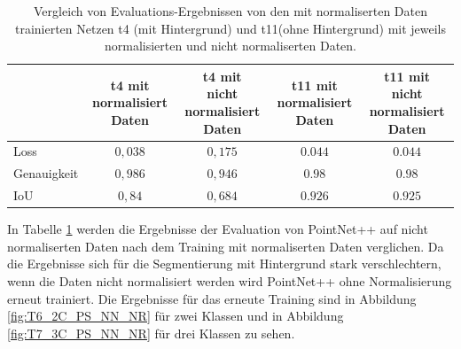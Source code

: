 \documentclass[12pt,titlepage, twoside]{article}
\begin{document}
\begin{table}
    \begin{center}
    \begin{tabular}{|l || c | c || c | c | } 
        \hline
         & \thead{t4 mit \\ normalisiert Daten}  & \thead{t4 mit \\ nicht normalisiert Daten} & \thead{t11 mit \\ normalisiert Daten} & \thead{t11 mit \\ nicht normalisiert Daten}  \\  
        \hline
        \hline
        Loss & $0,038$ & $0,175$& $0.044$& $0.044$\\
        \hline
        Genauigkeit & $0,986$& $0,946$& $0.98$& $0.98$\\
        \hline
        IoU & $0,84$& $0,684$& $0.926$& $0.925$\\
        \hline
    \end{tabular}
    \end{center}
    \caption{Vergleich von Evaluations-Ergebnissen von den mit normaliserten Daten trainierten Netzen t4 (mit Hintergrund) und t11(ohne Hintergrund) mit jeweils normalisierten und nicht normaliserten Daten.}
    \label{tab:segmentation:normalization:compare}
\end{table}

In Tabelle \ref{tab:segmentation:normalization:compare} werden die Ergebnisse der Evaluation von PointNet++ auf nicht normaliserten Daten nach dem Training mit normaliserten Daten verglichen.
Da die Ergebnisse sich für die Segmentierung mit Hintergrund stark verschlechtern, wenn die Daten nicht normalisiert werden wird PointNet++ ohne Normalisierung erneut trainiert. 
Die Ergebnisse für das erneute Training sind in Abbildung \ref{fig:T6_2C_PS_NN_NR} für zwei Klassen und in Abbildung \ref{fig:T7_3C_PS_NN_NR} für drei Klassen zu sehen.
\end{document}
